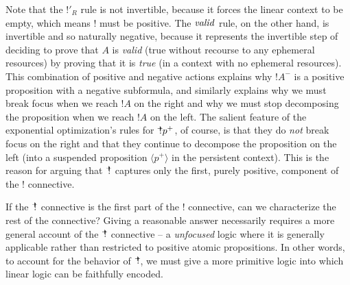Note that the ${!}'_R$ rule is not invertible,
because it forces the linear context to be empty, which means ${!}$
must be positive. The ${\it valid}$
rule, on the other hand, is invertible and so naturally negative,
because it represents the invertible step of deciding to prove that
$A$ is {\it valid} (true without recourse to any ephemeral resources)
by proving that it is {\it true}
(in a context with no ephemeral resources). This combination of
positive and negative actions explains why ${!}A^-$ is a positive
proposition with a negative subformula, and similarly explains why we
must break focus when we reach ${!}A$ on the right and why we must
stop decomposing the proposition when we reach ${!}A$ on the left.
The salient feature of the exponential optimization's rules for ${\mbox{\hspace{2pt}$\mathbb !$\hspace{-5pt}$^+$\hspace{-1pt}}}p^+$, of
course, is that they do {\it not} break focus on the right and that
they continue to decompose the proposition on the left (into a
suspended proposition $\langle p^+ \rangle$ in the persistent
context). This is the reason for arguing that ${\mbox{\hspace{2pt}$\mathbb !$\hspace{-5pt}$^+$\hspace{-1pt}}}$ captures only
the first, purely positive, component of the ${!}$ connective.

If the $\mbox{\hspace{2pt}$\mathbb !$\hspace{-5pt}$^+$\hspace{-1pt}}$ connective is the first part of the $!$ connective,
can we characterize the rest of the connective? Giving a reasonable
answer necessarily requires a more general account of the $\mbox{\hspace{2pt}$\mathbb !$\hspace{-5pt}$^+$\hspace{-1pt}}$
connective -- a {\it unfocused} logic where it is generally applicable
rather than restricted to positive atomic propositions. In other
words, to account for the behavior of $\mbox{\hspace{2pt}$\mathbb !$\hspace{-5pt}$^+$\hspace{-1pt}}$, we must give a more
primitive logic into which linear logic can be faithfully encoded.



